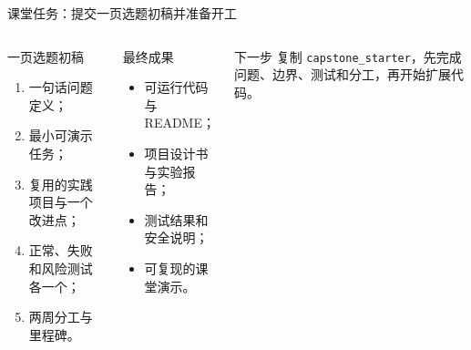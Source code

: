 \begin{frame}{课堂任务：提交一页选题初稿并准备开工}
  \begin{columns}[T,onlytextwidth]
      \begin{block}{一页选题初稿}
        \begin{enumerate}
          \item 一句话问题定义；
          \item 最小可演示任务；
          \item 复用的实践项目与一个改进点；
          \item 正常、失败和风险测试各一个；
          \item 两周分工与里程碑。
        \end{enumerate}
      \end{block}
      \begin{block}{最终成果}
        \begin{itemize}
          \item 可运行代码与 README；
          \item 项目设计书与实验报告；
          \item 测试结果和安全说明；
          \item 可复现的课堂演示。
        \end{itemize}
      \end{block}
      \begin{alertblock}{下一步}
        复制 \texttt{capstone\_starter}，先完成问题、边界、测试和分工，再开始扩展代码。
      \end{alertblock}
  \end{columns}
\end{frame}

